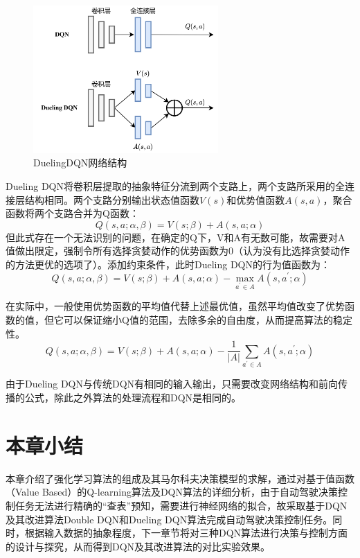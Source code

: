 \begin{figure}[htbp]
    \vspace{13pt} %
    \centering
    \includegraphics[width=0.63\textwidth]{images/chapter2/Dueling_DQN.png}
    \caption{DuelingDQN网络结构}\label{DuelingDQN网络结构} %
\end{figure}

Dueling DQN将卷积层提取的抽象特征分流到两个支路上，两个支路所采用的全连接层结构相同。两个支路分别输出状态值函数$V(s)$和优势值函数$A(s,a)$，聚合函数将两个支路合并为Q函数：
\begin{equation*}
    Q(s,a;\alpha,\beta) = V(s;\beta) + A(s,a;\alpha)
\end{equation*}
但此式存在一个无法识别的问题，在确定的Q下，V和A有无数可能，故需要对A值做出限定，强制令所有选择贪婪动作的优势函数为0（认为没有比选择贪婪动作的方法更优的选项了）。添加约束条件，此时Dueling DQN的行为值函数为：
\begin{equation}
    Q(s,a;\alpha,\beta) = V(s;\beta) + A(s,a;\alpha) - \max_{a^{'} \in A}A(s,a^{'};\alpha)
\end{equation}

在实际中，一般使用优势函数的平均值代替上述最优值，虽然平均值改变了优势函数的值，但它可以保证缩小Q值的范围，去除多余的自由度，从而提高算法的稳定性。
\begin{equation}
    Q(s,a;\alpha,\beta) = V(s;\beta) + A(s,a;\alpha) - \frac{1}{\left | A \right | } \sum_{a^{'} \in A}A(s,a^{'};\alpha)
\end{equation}

由于Dueling DQN与传统DQN有相同的输入输出，只需要改变网络结构和前向传播的公式，除此之外算法的处理流程和DQN是相同的。

\section{本章小结}%

本章介绍了强化学习算法的组成及其马尔科夫决策模型的求解，通过对基于值函数（Value Based）的Q-learning算法及DQN算法的详细分析，由于自动驾驶决策控制任务无法进行精确的“查表”预知，需要进行神经网络的拟合，故采取基于DQN及其改进算法Double DQN和Dueling DQN算法完成自动驾驶决策控制任务。同时，根据输入数据的抽象程度，下一章节将对三种DQN算法进行决策与控制方面的设计与探究，从而得到DQN及其改进算法的对比实验效果。
